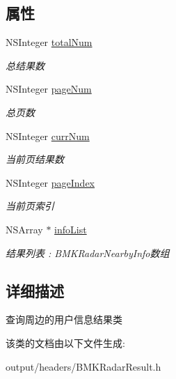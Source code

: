 \subsection*{属性}
\begin{DoxyCompactItemize}
\item 
\hypertarget{interface_b_m_k_radar_nearby_result_ad931d84d458739d11084ff0576d0e862}{}N\+S\+Integer \hyperlink{interface_b_m_k_radar_nearby_result_ad931d84d458739d11084ff0576d0e862}{total\+Num}\label{interface_b_m_k_radar_nearby_result_ad931d84d458739d11084ff0576d0e862}

\begin{DoxyCompactList}\small\item\em 总结果数 \end{DoxyCompactList}\item 
\hypertarget{interface_b_m_k_radar_nearby_result_ab228a70cd50bb53cbe6a9fd596f68699}{}N\+S\+Integer \hyperlink{interface_b_m_k_radar_nearby_result_ab228a70cd50bb53cbe6a9fd596f68699}{page\+Num}\label{interface_b_m_k_radar_nearby_result_ab228a70cd50bb53cbe6a9fd596f68699}

\begin{DoxyCompactList}\small\item\em 总页数 \end{DoxyCompactList}\item 
\hypertarget{interface_b_m_k_radar_nearby_result_a20c81dd39fb2b3138cfbf4515c6a0df6}{}N\+S\+Integer \hyperlink{interface_b_m_k_radar_nearby_result_a20c81dd39fb2b3138cfbf4515c6a0df6}{curr\+Num}\label{interface_b_m_k_radar_nearby_result_a20c81dd39fb2b3138cfbf4515c6a0df6}

\begin{DoxyCompactList}\small\item\em 当前页结果数 \end{DoxyCompactList}\item 
\hypertarget{interface_b_m_k_radar_nearby_result_ac09f7822498a0d2351d231cd939a8cd0}{}N\+S\+Integer \hyperlink{interface_b_m_k_radar_nearby_result_ac09f7822498a0d2351d231cd939a8cd0}{page\+Index}\label{interface_b_m_k_radar_nearby_result_ac09f7822498a0d2351d231cd939a8cd0}

\begin{DoxyCompactList}\small\item\em 当前页索引 \end{DoxyCompactList}\item 
\hypertarget{interface_b_m_k_radar_nearby_result_a0ac1ae3a70f81486a70eee896fdbddb4}{}N\+S\+Array $\ast$ \hyperlink{interface_b_m_k_radar_nearby_result_a0ac1ae3a70f81486a70eee896fdbddb4}{info\+List}\label{interface_b_m_k_radar_nearby_result_a0ac1ae3a70f81486a70eee896fdbddb4}

\begin{DoxyCompactList}\small\item\em 结果列表 \+: B\+M\+K\+Radar\+Nearby\+Info数组 \end{DoxyCompactList}\end{DoxyCompactItemize}


\subsection{详细描述}
查询周边的用户信息结果类 

该类的文档由以下文件生成\+:\begin{DoxyCompactItemize}
\item 
output/headers/B\+M\+K\+Radar\+Result.\+h\end{DoxyCompactItemize}
